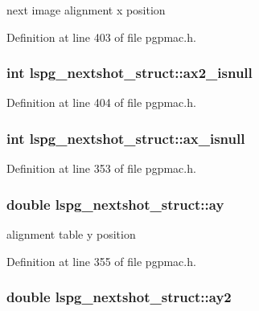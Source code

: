 next image alignment x position 



Definition at line 403 of file pgpmac.\-h.

\hypertarget{structlspg__nextshot__struct_a846845b0b9ecf6517ef85554771ec71d}{
\subsubsection[{ax2\-\_\-isnull}]{\setlength{\rightskip}{0pt plus 5cm}int lspg\-\_\-nextshot\-\_\-struct\-::ax2\-\_\-isnull}}\label{structlspg__nextshot__struct_a846845b0b9ecf6517ef85554771ec71d}


Definition at line 404 of file pgpmac.\-h.

\hypertarget{structlspg__nextshot__struct_aae46c7911b2b218497ad4a68f3dbb7d9}{
\subsubsection[{ax\-\_\-isnull}]{\setlength{\rightskip}{0pt plus 5cm}int lspg\-\_\-nextshot\-\_\-struct\-::ax\-\_\-isnull}}\label{structlspg__nextshot__struct_aae46c7911b2b218497ad4a68f3dbb7d9}


Definition at line 353 of file pgpmac.\-h.

\hypertarget{structlspg__nextshot__struct_a9e20b9a0aeb41f7f7d653a1c60335bf1}{
\subsubsection[{ay}]{\setlength{\rightskip}{0pt plus 5cm}double lspg\-\_\-nextshot\-\_\-struct\-::ay}}\label{structlspg__nextshot__struct_a9e20b9a0aeb41f7f7d653a1c60335bf1}


alignment table y position 



Definition at line 355 of file pgpmac.\-h.

\hypertarget{structlspg__nextshot__struct_ad13759740204b42e379161f98815f3d0}{
\subsubsection[{ay2}]{\setlength{\rightskip}{0pt plus 5cm}double lspg\-\_\-nextshot\-\_\-struct\-::ay2}}\label{structlspg__nextshot__struct_ad13759740204b42e379161f98815f3d0}


